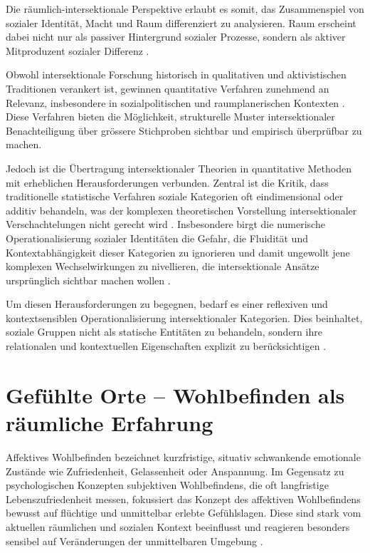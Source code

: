 Die räumlich-intersektionale Perspektive erlaubt es somit, das Zusammenspiel von sozialer Identität, Macht und Raum differenziert zu analysieren. Raum erscheint dabei nicht nur als passiver Hintergrund sozialer Prozesse, sondern als aktiver Mitproduzent sozialer Differenz \parencite{rodo-de-zarateIntersectionalityFeministGeographies2018}.

\vspace{2em}

Obwohl intersektionale Forschung historisch in qualitativen und aktivistischen Traditionen verankert ist, gewinnen quantitative Verfahren zunehmend an Relevanz, insbesondere in sozialpolitischen und raumplanerischen Kontexten \parencite{bauerIntersectionalityQuantitativeResearch2021}. Diese Verfahren bieten die Möglichkeit, strukturelle Muster intersektionaler Benachteiligung über grössere Stichproben sichtbar und empirisch überprüfbar zu machen.

Jedoch ist die Übertragung intersektionaler Theorien in quantitative Methoden mit erheblichen Herausforderungen verbunden. Zentral ist die Kritik, dass traditionelle statistische Verfahren soziale Kategorien oft eindimensional oder additiv behandeln, was der komplexen theoretischen Vorstellung intersektionaler Verschachtelungen nicht gerecht wird \parencite{hancockWhenMultiplicationDoesnt2007, bowlegInvitedReflectionQuantifying2016}. Insbesondere birgt die numerische Operationalisierung sozialer Identitäten die Gefahr, die Fluidität und Kontextabhängigkeit dieser Kategorien zu ignorieren und damit ungewollt jene komplexen Wechselwirkungen zu nivellieren, die intersektionale Ansätze ursprünglich sichtbar machen wollen \parencite{scottIntersectionalityQuantitativeMethods2017}.

Um diesen Herausforderungen zu begegnen, bedarf es einer reflexiven und kontextsensiblen Operationalisierung intersektionaler Kategorien. Dies beinhaltet, soziale Gruppen nicht als statische Entitäten zu behandeln, sondern ihre relationalen und kontextuellen Eigenschaften explizit zu berücksichtigen \parencite{rodo-de-zarateDevelopingGeographiesIntersectionality2014, websterCenteringSocialtechnicalRelations2021}.


\section{Gefühlte Orte -- Wohlbefinden als räumliche Erfahrung}

Affektives Wohlbefinden bezeichnet kurzfristige, situativ schwankende emotionale Zustände wie Zufriedenheit, Gelassenheit oder Anspannung. Im Gegensatz zu psychologischen Konzepten subjektiven Wohlbefindens, die oft langfristige Lebenszufriedenheit messen, fokussiert das Konzept des affektiven Wohlbefindens bewusst auf flüchtige und unmittelbar erlebte Gefühlslagen. Diese sind stark vom aktuellen räumlichen und sozialen Kontext beeinflusst und reagieren besonders sensibel auf Veränderungen der unmittelbaren Umgebung \parencite{dodgeChallengeDefiningWellbeing2012}.

